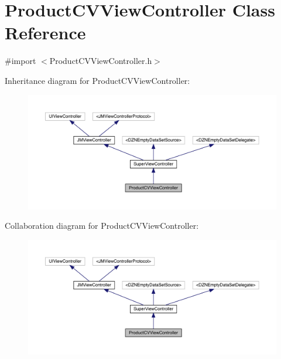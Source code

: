 \hypertarget{interface_product_c_v_view_controller}{}\section{Product\+C\+V\+View\+Controller Class Reference}
\label{interface_product_c_v_view_controller}


{\ttfamily \#import $<$Product\+C\+V\+View\+Controller.\+h$>$}



Inheritance diagram for Product\+C\+V\+View\+Controller\+:\nopagebreak
\begin{figure}[H]
\begin{center}
\leavevmode
\includegraphics[width=350pt]{interface_product_c_v_view_controller__inherit__graph}
\end{center}
\end{figure}


Collaboration diagram for Product\+C\+V\+View\+Controller\+:\nopagebreak
\begin{figure}[H]
\begin{center}
\leavevmode
\includegraphics[width=350pt]{interface_product_c_v_view_controller__coll__graph}
\end{center}
\end{figure}
